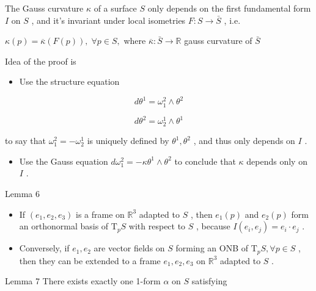 \documentclass[lang=cn,a4paper,11pt,openany,twoside]{elegantbook}
\begin{document}
The Gauss curvature \(\kappa\) of a surface \(S\) only depends on the first fundamental form \(I\) on \(S\) , and it’s invariant under local isometries \(F : S \rightarrow  \bar{S}\) , i.e.

\(\kappa \left( p\right)  = \overline{\kappa }\left( {F\left( p\right) }\right) ,\;\forall p \in  S,\) where \(\overline{\kappa } : \bar{S} \rightarrow  \mathbb{R}\) gauss curvature of \(\bar{S}\)

Idea of the proof is

\begin{itemize}\relax
\item\relax Use the structure equation
\end{itemize}

\[
d{\theta }^{1} = {\omega }_{1}^{2} \land  {\theta }^{2}
\]

\[
d{\theta }^{2} = {\omega }_{2}^{1} \land  {\theta }^{1}
\]

to say that \({\omega }_{1}^{2} =  - {\omega }_{2}^{1}\) is uniquely defined by \({\theta }^{1},{\theta }^{2}\) , and thus only depends on \(I\) .

\begin{itemize}\relax
\item\relax Use the Gauss equation \(d{\omega }_{1}^{2} =  - \kappa {\theta }^{1} \land  {\theta }^{2}\) to conclude that \(\kappa\) depends only on \(I\) .
\end{itemize}

Lemma 6

\begin{itemize}\relax
\item\relax If \(\left( {{e}_{1},{e}_{2},{e}_{3}}\right)\) is a frame on \({\mathbb{R}}^{3}\) adapted to \(S\) , then \({e}_{1}\left( p\right)\) and \({e}_{2}\left( p\right)\) form an orthonormal basis of \({\mathrm{T}}_{p}S\) with respect to \(S\) , because \(I\left( {{e}_{i},{e}_{j}}\right)  = {e}_{i} \cdot  {e}_{j}\) .
\end{itemize}

\begin{itemize}\relax
\item\relax Conversely, if \({e}_{1},{e}_{2}\) are vector fields on \(S\) forming an ONB of \({\mathrm{T}}_{p}S,\forall p \in  S\) , then they can be extended to a frame \({e}_{1},{e}_{2},{e}_{3}\) on \({\mathbb{R}}^{3}\) adapted to \(S\) .
\end{itemize}

Lemma 7 There exists exactly one 1-form \(\alpha\) on \(S\) satisfying
\end{document}
